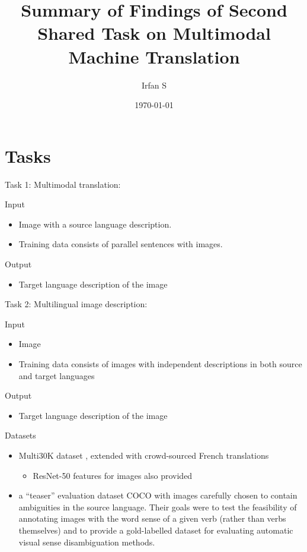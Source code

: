 \documentclass[presentation]{beamer}
\author{Irfan S}
\date{\today}
\title{Summary of Findings of Second Shared Task on Multimodal Machine Translation}
\begin{document}
\maketitle
\section{Tasks}
\label{sec:org805ec7f}
\begin{frame}[label={sec:org970d322}]{Task 1: Multimodal translation:}
\begin{block}{Input}
\begin{itemize}
\item Image with a source language description.
\item Training data consists of parallel sentences with images.
\end{itemize}
\end{block}

\begin{block}{Output}
\begin{itemize}
\item Target language description of the image
\end{itemize}
\end{block}
\end{frame}

\begin{frame}[label={sec:org4966c0f}]{Task 2: Multilingual image description:}
\begin{block}{Input}
\begin{itemize}
\item Image
\item Training data consists of images with independent descriptions in both source and target languages
\end{itemize}
\end{block}

\begin{block}{Output}
\begin{itemize}
\item Target language description of the image
\end{itemize}
\end{block}
\end{frame}


\begin{frame}[label={sec:org1b360f6}]{Datasets}
\begin{itemize}
\item Multi30K dataset \cite{elliott2016multi30k}, extended with crowd-sourced French translations
\begin{itemize}
\item ResNet-50 \cite{he2016deep} features for images also provided
\end{itemize}
\item a “teaser” evaluation dataset COCO with images carefully chosen to contain ambiguities in the source language. Their goals were to test the feasibility of annotating images with the word sense of a given verb (rather than verbs themselves) and to provide a gold-labelled dataset for evaluating automatic visual sense disambiguation methods.
\end{itemize}
\end{frame}
\end{document}
